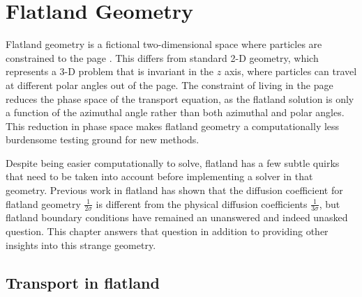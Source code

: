 
\chapter{Flatland Geometry}

Flatland geometry is a fictional two-dimensional space where particles are
constrained to the page \cite{Asa2008}. This differs from standard 2-D
geometry, which represents a 3-D problem that is invariant in the $z$ axis,
where particles can travel at different polar angles out of the page. The
constraint of living in the page reduces the phase space of the transport
equation, as the flatland solution is only a function of the azimuthal angle
rather than both azimuthal and polar angles. This reduction in phase space makes 
flatland geometry a computationally less burdensome testing ground for new
methods.

Despite being easier computationally to solve, flatland has a few subtle quirks
that need to be taken into account before implementing a solver in that
geometry. Previous work in flatland \cite{Asa2008,Lar2009c} has shown that the
diffusion coefficient for flatland geometry $\frac{1}{2\sigma}$ is different from
the physical diffusion coefficients $\frac{1}{3\sigma}$, but flatland boundary
conditions have remained an unanswered and indeed unasked question. This
chapter answers that question in addition to providing other insights into this
strange geometry.

\section{Transport in flatland}

